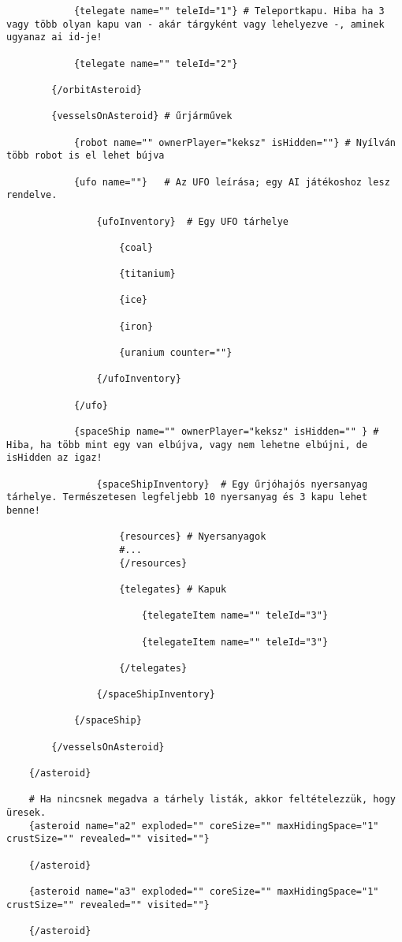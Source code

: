 \documentclass[../../projlab]{subfiles}
\begin{document}
\begin{verbatim}
			{telegate name="" teleId="1"} # Teleportkapu. Hiba ha 3 vagy több olyan kapu van - akár tárgyként vagy lehelyezve -, aminek ugyanaz ai id-je!
			
			{telegate name="" teleId="2"}
		
		{/orbitAsteroid}
		
		{vesselsOnAsteroid} # űrjárművek
		
			{robot name="" ownerPlayer="keksz" isHidden=""} # Nyílván több robot is el lehet bújva
			
			{ufo name=""}	# Az UFO leírása; egy AI játékoshoz lesz rendelve.
			
				{ufoInventory}  # Egy UFO tárhelye
				
					{coal}
				
					{titanium}
					
					{ice}
					
					{iron}
					
					{uranium counter=""}
					
				{/ufoInventory}
			
			{/ufo}
			
			{spaceShip name="" ownerPlayer="keksz" isHidden="" } # Hiba, ha több mint egy van elbújva, vagy nem lehetne elbújni, de isHidden az igaz!
			
				{spaceShipInventory}  # Egy űrjóhajós nyersanyag tárhelye. Természetesen legfeljebb 10 nyersanyag és 3 kapu lehet benne!
				
					{resources} # Nyersanyagok
					#...
					{/resources}

					{telegates} # Kapuk

						{telegateItem name="" teleId="3"}
					
						{telegateItem name="" teleId="3"}

					{/telegates}
				
				{/spaceShipInventory}
			
			{/spaceShip}
		
		{/vesselsOnAsteroid}
	
	{/asteroid}
	
	# Ha nincsnek megadva a tárhely listák, akkor feltételezzük, hogy üresek.
	{asteroid name="a2" exploded="" coreSize="" maxHidingSpace="1" crustSize="" revealed="" visited=""}
	
	{/asteroid}
	
	{asteroid name="a3" exploded="" coreSize="" maxHidingSpace="1" crustSize="" revealed="" visited=""}
	
	{/asteroid}
	

\end{verbatim}
\end{document}
